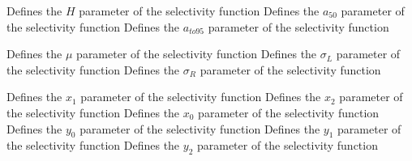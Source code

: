  {Defines the $H$ parameter of the selectivity function}
 {Defines the $a_{50}$ parameter of the selectivity function}
 {Defines the $a_{to95}$ parameter of the selectivity function}
\par\textbf{}\par
{} {Defines the $\mu$ parameter of the selectivity function}
 {Defines the $\sigma_L$ parameter of the selectivity function}
 {Defines the $\sigma_R$ parameter of the selectivity function}
\par\textbf{}\par
{} {Defines the $x_1$ parameter of the selectivity function}
 {Defines the $x_2$ parameter of the selectivity function}
 {Defines the $x_0$ parameter of the selectivity function}
 {Defines the $y_0$ parameter of the selectivity function}
 {Defines the $y_1$ parameter of the selectivity function}
 {Defines the $y_2$ parameter of the selectivity function}
